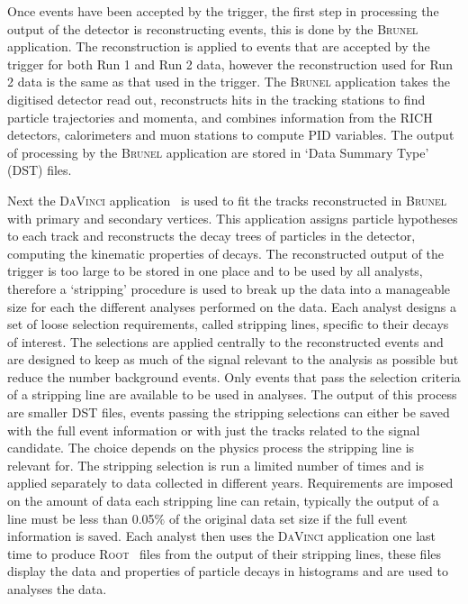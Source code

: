 Once events have been accepted by the trigger, the first step in processing the output of the detector is reconstructing events, this is done by the \textsc{Brunel}~\cite{Brunel} application. The reconstruction is applied to events that are accepted by the trigger for both Run 1 and Run 2 data, however the reconstruction used for Run 2 data is the same as that used in the trigger. The \textsc{Brunel} application takes the digitised detector read out, reconstructs hits in the tracking stations to find particle trajectories and momenta, and combines information from the RICH detectors, calorimeters and muon stations to compute PID variables. The output of processing by the \textsc{Brunel} application are stored in `Data Summary Type' (DST) files. 

Next the \textsc{DaVinci} application~\cite{DV} is used to fit the tracks reconstructed in \textsc{Brunel} with primary and secondary vertices. This application assigns particle hypotheses to each track and reconstructs the decay trees of particles in the detector, computing the kinematic properties of decays. The reconstructed output of the trigger is too large to be stored in one place and to be used by all analysts, therefore a `stripping' procedure is used to break up the data into a manageable size for each the different analyses performed on the data. Each analyst designs a set of loose selection requirements, called stripping lines, specific to their decays of interest. The selections are applied centrally to the reconstructed events and are designed to keep as much of the signal relevant to the analysis as possible but reduce the number background events. Only events that pass the selection criteria of a stripping line are available to be used in analyses. The output of this process are smaller DST files, events passing the stripping selections can either be saved with the full event information or with just the tracks related to the signal candidate. The choice depends on the physics process the stripping line is relevant for. The stripping selection is run a limited number of times and is applied separately to data collected in different years. Requirements are imposed on the amount of data each stripping line can retain, typically the output of a line must be less than 0.05$\%$ of the original data set size if the full event information is saved. Each analyst then uses the \textsc{DaVinci} application one last time to produce \textsc{Root}~\cite{Brun:1997pa} files from the output of their stripping lines, these files display the data and properties of particle decays in histograms and are used to analyses the data. %


